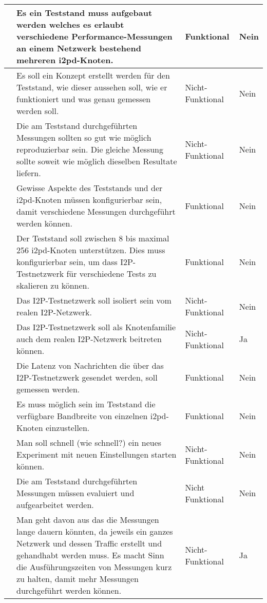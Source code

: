 \begin{longtable}{N p{8.5cm} l l}
      & Es ein Teststand muss aufgebaut werden welches es erlaubt verschiedene Performance-Messungen
                  an einem Netzwerk bestehend mehreren i2pd-Knoten. & Funktional & Nein \\ \midrule
      & Es soll ein Konzept erstellt werden für den Teststand, wie dieser aussehen soll, wie er funktioniert und was genau gemessen werden soll. & Nicht-Funktional & Nein \\ \midrule
      & Die am Teststand durchgeführten Messungen sollten so gut wie möglich reproduzierbar sein. Die gleiche Messung sollte soweit wie möglich dieselben Resultate liefern. & Nicht-Funktional & Nein \\ \midrule
      & Gewisse Aspekte des Teststands und der i2pd-Knoten müssen konfigurierbar sein, damit verschiedene Messungen durchgeführt werden können.  & Funktional & Nein \\ \midrule
      & Der Teststand soll zwischen 8 bis maximal 256 i2pd-Knoten unterstützen. Dies muss konfigurierbar sein, um dass I2P-Testnetzwerk für verschiedene Tests zu skalieren zu können. & Funktional & Nein \\ \midrule
      & Das I2P-Testnetzwerk soll isoliert sein vom realen I2P-Netzwerk. & Nicht-Funktional & Nein \\ \midrule
      & Das I2P-Testnetzwerk soll als Knotenfamilie auch dem realen I2P-Netzwerk beitreten können. & Nicht-Funktional & Ja \\ \midrule
      & Die Latenz von Nachrichten die über das I2P-Testnetzwerk gesendet werden, soll gemessen werden. & Funktional & Nein \\ \midrule
      & Es muss möglich sein im Teststand die verfügbare Bandbreite von einzelnen i2pd-Knoten einzustellen. & Funktional & Nein \\ \midrule
      & Man soll schnell (wie schnell?) ein neues Experiment mit neuen Einstellungen starten können. & Nicht-Funktional & Nein \\ \midrule
      & Die am Teststand durchgeführten Messungen müssen evaluiert und aufgearbeitet werden.  & Nicht Funktional & Nein \\ \midrule
      & Man geht davon aus das die Messungen lange dauern könnten, da jeweils ein ganzes Netzwerk und dessen Traffic erstellt und gehandhabt werden muss. Es macht Sinn die Ausführungszeiten von Messungen kurz zu halten, damit mehr Messungen durchgeführt werden können. & Nicht-Funktional & Ja \\ \midrule

\end{longtable}

